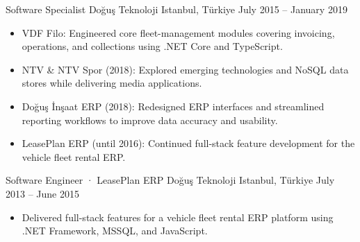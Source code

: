 \resumeSubheading
  {Software Specialist}
  {Doğuş Teknoloji}
  {Istanbul, Türkiye}
  {July 2015 -- January 2019}
\begin{itemize}
  \item VDF Filo: Engineered core fleet-management modules covering invoicing, operations, and collections using .NET Core and TypeScript.
  \item NTV \& NTV Spor (2018): Explored emerging technologies and NoSQL data stores while delivering media applications.
  \item Doğuş İnşaat ERP (2018): Redesigned ERP interfaces and streamlined reporting workflows to improve data accuracy and usability.
  \item LeasePlan ERP (until 2016): Continued full-stack feature development for the vehicle fleet rental ERP.
\end{itemize}
\vspace{0.3em}

\resumeSubheading
  {Software Engineer · LeasePlan ERP}
  {Doğuş Teknoloji}
  {Istanbul, Türkiye}
  {July 2013 -- June 2015}
\begin{itemize}
  \item Delivered full-stack features for a vehicle fleet rental ERP platform using .NET Framework, MSSQL, and JavaScript.
\end{itemize}
